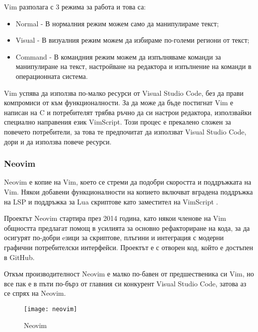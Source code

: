 Vim разполага с 3 режима за работа и това са:
\begin{itemize}
\item Normal - В нормалния режим можем само да манипулираме текст;
\item Visual - В визуалния режим можем да избираме по-големи региони от текст;
\item Command - В командния режим можем да изпълняваме команди за манипулиране
на текст, настройване на редактора и изпълнение на команди в операционната
система.
\end{itemize}

Vim успява да използва по-малко ресурси от Visual Studio Code, без да прави компромиси от към
функционалности. За да може да бъде постигнат Vim е написан на C и потребителят
трябва ръчно да си настрои редактора, използвайки специално направения език
VimScript. Този процес е прекалено сложен за повечето потребители, за това те
предпочитат да използват Visual Studio Code, дори и да използва повече ресурси.

\subsubsection{Neovim}
Neovim е копие на Vim, което се стреми да подобри скоростта и поддръжката на
Vim. Някои добавени функционалности на копието включват вградена поддръжка на
LSP и поддръжка за Lua скриптове като заместител на VimScript \cite{neovim_wikipedia}.

Проектът Neovim стартира през 2014 година, като някои членове на Vim общността
предлагат помощ в усилията за основно рефакториране на кода, за да осигурят по-добри
eзици за скриптове, плъгини и интеграция с модерни графични потребителски интерфейси.
Проектът е с отворен код, който е достъпен в GitHub. \cite{neovim_github}

Откъм производителност Neovim е малко по-бавен от предшественика си Vim, но
все пак е в пъти по-бърз от главния си конкурент Visual Studio Code, затова аз
се спрях на Neovim.

\begin{figure}[!htb]
  \texttt{[image: neovim]}
  \centering
  \caption{Neovim}
  \label{fig:neovim}
\end{figure}

